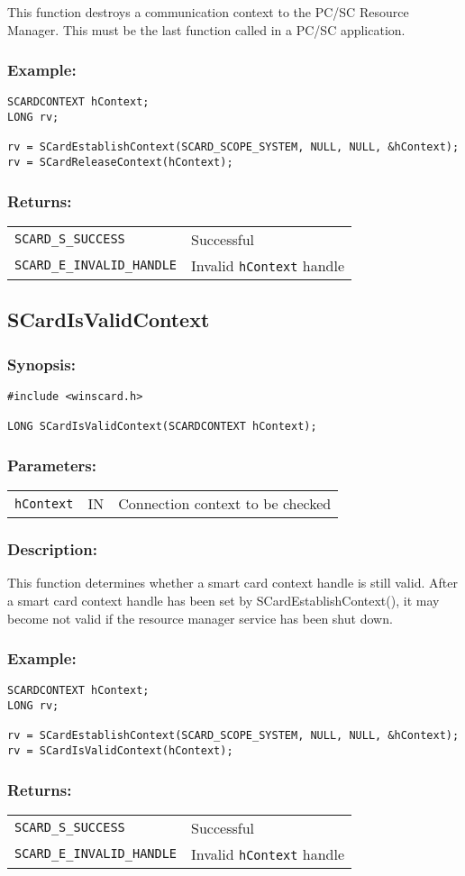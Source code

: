 \documentclass[a4paper,12pt]{article}
\newcommand{\synopsis}{\subsubsection{Synopsis:}}
\newcommand{\parameters}{\subsubsection{Parameters:}}
\newcommand{\desc}{\subsubsection{Description:}}
\newcommand{\example}{\subsubsection{Example:}}
\newcommand{\returns}{\subsubsection{Returns:}}
\begin{document}
This function destroys a communication context to the PC/SC Resource
Manager. This must be the last function called in a PC/SC application.

\example
\begin{verbatim}
SCARDCONTEXT hContext;
LONG rv;

rv = SCardEstablishContext(SCARD_SCOPE_SYSTEM, NULL, NULL, &hContext);
rv = SCardReleaseContext(hContext);
\end{verbatim}

\returns

\begin{tabular}{ll}
\texttt{SCARD\_S\_SUCCESS} & Successful\\
\texttt{SCARD\_E\_INVALID\_HANDLE} & Invalid \texttt{hContext} handle
\end{tabular}


\subsection{SCardIsValidContext}

\synopsis
\begin{verbatim}
#include <winscard.h>

LONG SCardIsValidContext(SCARDCONTEXT hContext);
\end{verbatim}

\parameters

\begin{tabular}{lll}
\texttt{hContext} & IN & Connection context to be checked
\end{tabular}

\desc

This function determines whether a smart card context handle is still
valid. After a smart card context handle has been set by
SCardEstablishContext(), it may become not valid if the resource manager
service has been shut down.

\example
\begin{verbatim}
SCARDCONTEXT hContext;
LONG rv;

rv = SCardEstablishContext(SCARD_SCOPE_SYSTEM, NULL, NULL, &hContext);
rv = SCardIsValidContext(hContext);
\end{verbatim}

\returns

\begin{tabular}{ll}
\texttt{SCARD\_S\_SUCCESS} & Successful\\
\texttt{SCARD\_E\_INVALID\_HANDLE} & Invalid \texttt{hContext} handle
\end{tabular}
\end{document}
